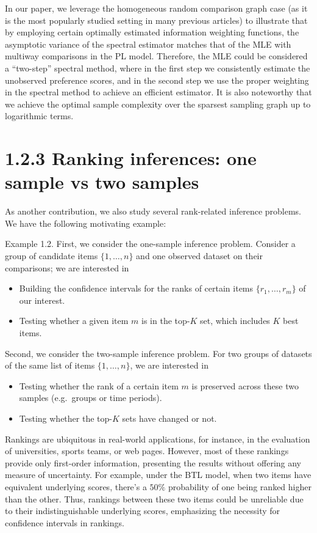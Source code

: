 In our paper, we leverage the homogeneous random comparison graph case (as it is the most popularly studied setting in many previous articles) to illustrate that by employing certain optimally estimated information weighting functions, the asymptotic variance of the spectral estimator matches that of the MLE with multiway comparisons in the PL model. Therefore, the MLE could be considered a ``two-step'' spectral method, where in the first step we consistently estimate the unobserved preference scores, and in the second step we use the proper weighting in the spectral method to achieve an efficient estimator. It is also noteworthy that we achieve the optimal sample complexity over the sparsest sampling graph up to logarithmic terms.

\section{1.2.3 Ranking inferences: one sample vs two samples}\label{ranking-inferences-one-sample-vs-two-samples}

As another contribution, we also study several rank-related inference problems. We have the following motivating example:

Example 1.2. First, we consider the one-sample inference problem. Consider a group of candidate items \(\{1,\dots ,n\}\) and one observed dataset on their comparisons; we are interested in
\begin{itemize}
\tightlist
\item
  Building the confidence intervals for the ranks of certain items \(\{r_1,\dots ,r_m\}\) of our interest.
\item
  Testing whether a given item \(m\) is in the top-\(K\) set, which includes \(K\) best items.
\end{itemize}
Second, we consider the two-sample inference problem. For two groups of datasets of the same list of items \(\{1,\dots ,n\}\), we are interested in
\begin{itemize}
\tightlist
\item
  Testing whether the rank of a certain item \(m\) is preserved across these two samples (e.g.~groups or time periods).
\item
  Testing whether the top-\(K\) sets have changed or not.
\end{itemize}

Rankings are ubiquitous in real-world applications, for instance, in the evaluation of universities, sports teams, or web pages. However, most of these rankings provide only first-order information, presenting the results without offering any measure of uncertainty. For example, under the BTL model, when two items have equivalent underlying scores, there's a \(50\%\) probability of one being ranked higher than the other. Thus, rankings between these two items could be unreliable due to their indistinguishable underlying scores, emphasizing the necessity for confidence intervals in rankings.

